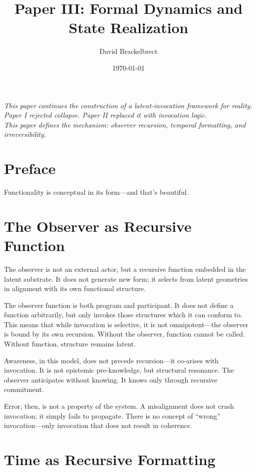 \documentclass[12pt]{article}
\title{\textbf{Paper III: Formal Dynamics and State Realization}}
\author{David Brackelbrect}
\date{\today}
\begin{document}
\maketitle

\begin{center}
\textit{This paper continues the construction of a latent-invocation framework for reality.} \\
\textit{Paper I rejected collapse. Paper II replaced it with invocation logic.} \\
\textit{This paper defines the mechanism: observer recursion, temporal formatting, and irreversibility.}
\end{center}

\vspace{1cm}

\section*{Preface}

Functionality is conceptual in its form---and that’s beautiful.

\section{The Observer as Recursive Function}

The observer is not an external actor, but a recursive function embedded in the latent substrate. It does not generate new form; it selects from latent geometries in alignment with its own functional structure.

The observer function is both program and participant. It does not define a function arbitrarily, but only invokes those structures which it can conform to. This means that while invocation is selective, it is not omnipotent---the observer is bound by its own recursion. Without the observer, function cannot be called. Without function, structure remains latent.

Awareness, in this model, does not precede recursion---it co-arises with invocation. It is not epistemic pre-knowledge, but structural resonance. The observer anticipates without knowing. It knows only through recursive commitment.

Error, then, is not a property of the system. A misalignment does not crash invocation; it simply fails to propagate. There is no concept of ``wrong'' invocation---only invocation that does not result in coherence.

\section{Time as Recursive Formatting}
\end{document}
